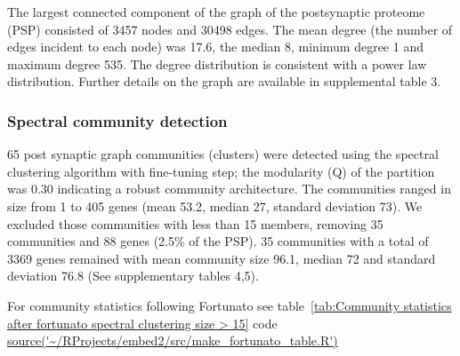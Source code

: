 The largest connected component of the graph of the postsynaptic proteome (PSP) consisted of 3457 nodes and 30498 edges. The mean degree (the number of edges incident to each node) was 17.6, the median 8, minimum degree 1 and maximum degree 535. The degree distribution is consistent with a power law distribution. Further details on the graph are available in supplemental table 3. 
\subsubsection{Spectral community detection}
65 post synaptic graph communities (clusters) were detected using the spectral clustering algorithm with fine-tuning step; the modularity (Q) of the partition was 0.30 indicating a robust community architecture.  The communities ranged in size from 1 to 405 genes (mean 53.2, median 27, standard deviation 73). We excluded those communities with less than 15 members, removing 35 communities and 88 genes (2.5\% of the PSP). 35 communities with a total of 3369 genes remained with mean community size 96.1, median 72 and standard deviation 76.8 (See supplementary tables 4,5).   

For community statistics following Fortunato \cite{fortunato2016community} see table~\ref{tab:Community statistics after fortunato spectral clustering size > 15} 
code \url{source('~/RProjects/embed2/src/make_fortunato_table.R')}




